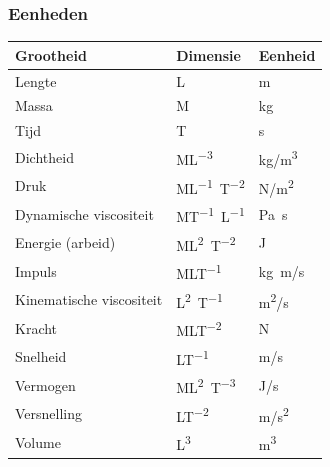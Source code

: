 \documentclass[t]{beamer}
\begin{document}
	\begin{frame}
		\frametitle{Eenheden}
		\center
		\begin{tabular}{lll}
			\hline
			Grootheid                   & Dimensie   & Eenheid \\
			\hline
			Lengte                       & \unit{L}                      &   \unit{m} \\
			Massa                        & \unit{M}                      &   \unit{kg} \\
			Tijd                         & \unit{T}                      &   \unit{s} \\
			Dichtheid                    & \unit{ML^{-3}}                &   \unit{kg/m^3} \\
			Druk                         & \unit{ML^{-1}T^{-2}}          &   \unit{N/m^2} \\	
			Dynamische viscositeit       & \unit{MT^{-1}L^{-1}}          &   \unit{Pa s} \\
			Energie (arbeid)             & \unit{ML^{2}T^{-2}}           &   \unit{J} \\
			Impuls                       & \unit{MLT^{-1}}               &   \unit{kg m/s} \\
			Kinematische viscositeit     & \unit{L^{2}T^{-1}}            &   \unit{m^2/s} \\
			Kracht                       & \unit{MLT^{-2}}               &   \unit{N} \\
			Snelheid                     & \unit{LT^{-1}}                &   \unit{m/s} \\
			Vermogen                     & \unit{ML^{2}T^{-3}}           &   \unit{J/s} \\
			Versnelling                  & \unit{LT^{-2}}                &   \unit{m/s^2} \\
			Volume                       & \unit{L^3}                    &   \unit{m^3} \\
			\hline
		\end{tabular}
	\end{frame}	
\end{document}
